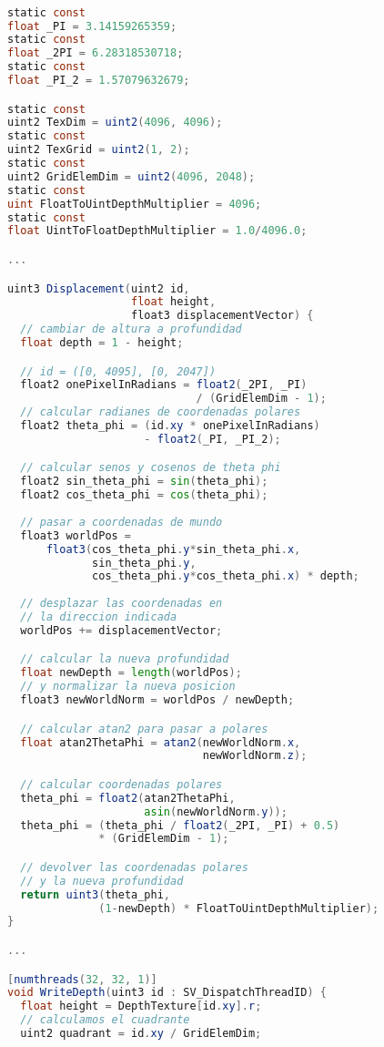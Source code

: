 \begin{lstlisting}[language=glsl]

static const 
float _PI = 3.14159265359;
static const 
float _2PI = 6.28318530718;
static const 
float _PI_2 = 1.57079632679;

static const 
uint2 TexDim = uint2(4096, 4096);
static const 
uint2 TexGrid = uint2(1, 2);
static const 
uint2 GridElemDim = uint2(4096, 2048);
static const 
uint FloatToUintDepthMultiplier = 4096;
static const 
float UintToFloatDepthMultiplier = 1.0/4096.0;

...

uint3 Displacement(uint2 id, 
                   float height, 
                   float3 displacementVector) {
  // cambiar de altura a profundidad
  float depth = 1 - height;

  // id = ([0, 4095], [0, 2047])
  float2 onePixelInRadians = float2(_2PI, _PI) 
                             / (GridElemDim - 1);
  // calcular radianes de coordenadas polares
  float2 theta_phi = (id.xy * onePixelInRadians) 
                     - float2(_PI, _PI_2);

  // calcular senos y cosenos de theta phi
  float2 sin_theta_phi = sin(theta_phi);
  float2 cos_theta_phi = cos(theta_phi);
    
  // pasar a coordenadas de mundo
  float3 worldPos = 
      float3(cos_theta_phi.y*sin_theta_phi.x, 
             sin_theta_phi.y,
             cos_theta_phi.y*cos_theta_phi.x) * depth;
             
  // desplazar las coordenadas en 
  // la direccion indicada
  worldPos += displacementVector;

  // calcular la nueva profundidad
  float newDepth = length(worldPos);
  // y normalizar la nueva posicion
  float3 newWorldNorm = worldPos / newDepth; 

  // calcular atan2 para pasar a polares
  float atan2ThetaPhi = atan2(newWorldNorm.x, 
                              newWorldNorm.z);

  // calcular coordenadas polares
  theta_phi = float2(atan2ThetaPhi, 
                     asin(newWorldNorm.y));
  theta_phi = (theta_phi / float2(_2PI, _PI) + 0.5) 
              * (GridElemDim - 1);

  // devolver las coordenadas polares
  // y la nueva profundidad
  return uint3(theta_phi, 
              (1-newDepth) * FloatToUintDepthMultiplier);
}

...

[numthreads(32, 32, 1)]
void WriteDepth(uint3 id : SV_DispatchThreadID) {
  float height = DepthTexture[id.xy].r;
  // calculamos el cuadrante
  uint2 quadrant = id.xy / GridElemDim;


\end{lstlisting}

